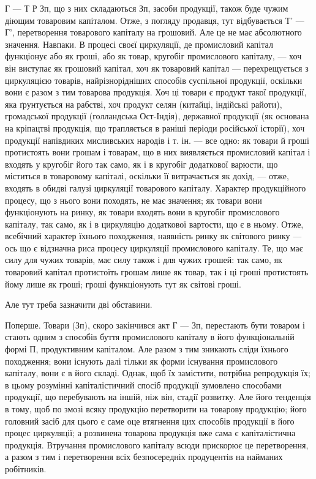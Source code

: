 \parcont{}  %
Г — Т Р Зп, що з них складаються Зп, засоби продукції, також буде
чужим діющим товаровим капіталом. Отже, з погляду продавця, тут
відбувається Т' — Г', перетворення товарового капіталу на грошовий. Але
це не має абсолютного значення. Навпаки. В процесі своєї циркуляції,
де промисловий капітал функціонує або як гроші, або як товар, кругобіг
промислового капіталу, — хоч він виступає як грошовий капітал, хоч як
товаровий капітал — перехрещується з циркуляцією товарів, найрізнорідніших
способів суспільної продукції, оскільки вони є разом з тим товарова
продукція. Хоч ці товари є продукт такої продукції, яка ґрунтується
на рабстві, хоч продукт селян (китайці, індійські райоти),
громадської продукції (голландська Ост-Індія), державної продукції (як
основана на кріпацтві продукція, що трапляється в раніші періоди російської
історії), хоч продукції напівдиких мисливських народів і т. ін.
— все одно: як товари й гроші протистоять вони грошам і товарам,
що в них виявляється промисловий капітал і входять у кругобіг його так само,
як і в кругобіг додаткової варюсти, що міститься в товаровому капіталі,
оскільки її витрачається як дохід, — отже, входять в обидві галузі
циркуляції товарового капіталу. Характер продукційного процесу, що
з нього вони походять, не має значення; як товари вони функціонують
на ринку, як товари входять вони в кругобіг промислового капіталу, так
само, як і в циркуляцію додаткової вартости, що є в ньому. Отже, всебічний
характер їхнього походження, наявність ринку як світового ринку
— ось що є відзначна риса процесу циркуляції промислового капіталу.
Те, що має силу для чужих товарів, має силу також і для чужих грошей: так
само, як товаровий капітал протистоїть грошам лише як товар, так і ці
гроші протистоять йому лише як гроші; гроші функціонують тут як
світові гроші.

Але тут треба зазначити дві обставини.

Поперше. Товари (Зп), скоро закінчився акт Г — Зп, перестають бути
товаром і стають одним з способів буття промислового капіталу в його
функціональній формі П, продуктивним капіталом. Але разом з тим
зникають сліди їхнього походження; вони існують далі тільки як форми
існування промислового капіталу, вони є в його складі. Однак, щоб
їх замістити, потрібна репродукція їх; в цьому розумінні капіталістичний
спосіб продукції зумовлено способами продукції, що перебувають на
іншій, ніж він, стадії розвитку. Але його тенденція в тому, щоб по змозі
всяку продукцію перетворити на товарову продукцію; його головний засіб
для цього є саме оце втягнення цих способів продукції в його процес
циркуляції; а розвинена товарова продукція вже сама є капіталістична
продукція. Втручання промислового капіталу всюди прискорює це перетворення,
а разом з тим і перетворення всіх безпосередніх продуцентів
на найманих робітників.


